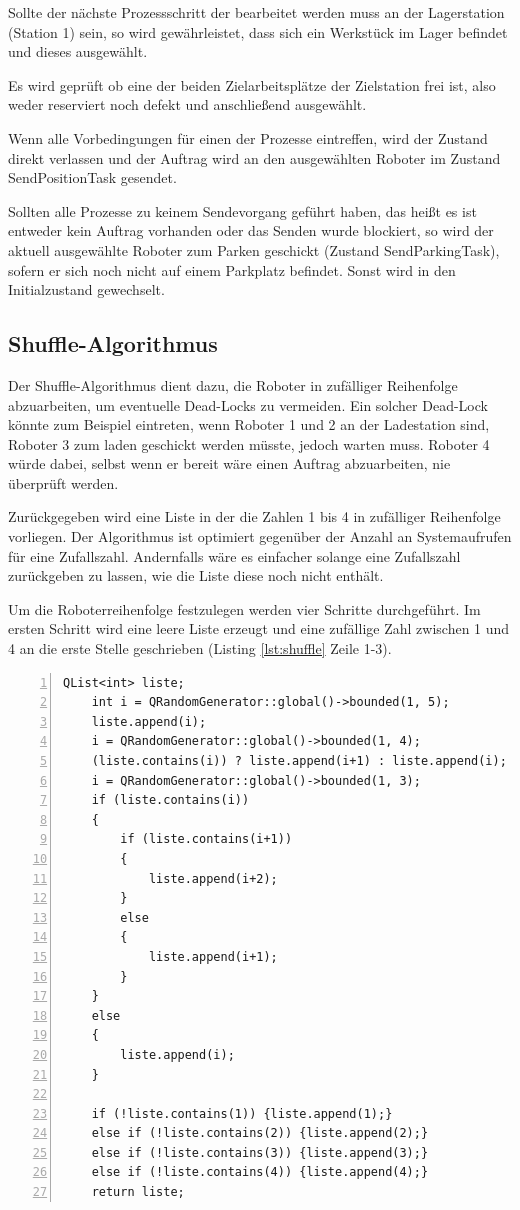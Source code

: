 Sollte der nächste Prozessschritt der bearbeitet werden muss an der Lagerstation (Station 1) sein, so wird gewährleistet, dass sich ein Werkstück im Lager befindet und dieses ausgewählt. 

Es wird geprüft ob eine der beiden Zielarbeitsplätze der Zielstation frei ist, also weder reserviert noch defekt und anschließend ausgewählt. 

Wenn alle Vorbedingungen für einen der Prozesse eintreffen, wird der Zustand direkt verlassen und der Auftrag wird an den ausgewählten Roboter im Zustand SendPositionTask gesendet. 

Sollten alle Prozesse zu keinem Sendevorgang geführt haben, das heißt es ist entweder kein Auftrag vorhanden oder das Senden wurde blockiert, so wird der aktuell ausgewählte Roboter zum Parken geschickt (Zustand SendParkingTask), sofern er sich noch nicht auf einem Parkplatz befindet. Sonst wird in den Initialzustand gewechselt.

\subsection{Shuffle-Algorithmus}
\label{sec:shuffle}

Der Shuffle-Algorithmus dient dazu, die Roboter in zufälliger Reihenfolge abzuarbeiten, um eventuelle Dead-Locks zu vermeiden. Ein solcher Dead-Lock könnte zum Beispiel eintreten, wenn Roboter 1 und 2 an der Ladestation sind, Roboter 3 zum laden geschickt werden müsste, jedoch warten muss. Roboter 4 würde dabei, selbst wenn er bereit wäre einen Auftrag abzuarbeiten, nie überprüft werden.

Zurückgegeben wird eine Liste in der die Zahlen 1 bis 4 in zufälliger Reihenfolge vorliegen. Der Algorithmus ist optimiert gegenüber der Anzahl an Systemaufrufen für eine Zufallszahl. Andernfalls wäre es einfacher solange eine Zufallszahl zurückgeben zu lassen,  wie die Liste diese noch nicht enthält.

Um die Roboterreihenfolge festzulegen werden vier Schritte durchgeführt. Im ersten Schritt wird eine leere Liste erzeugt und eine zufällige Zahl zwischen 1 und 4 an die erste Stelle geschrieben (Listing \ref{lst:shuffle} Zeile 1-3). 

\begin{lstlisting}[frame=single, breaklines=true, numbers=left, stepnumber=2, firstnumber=1, numberstyle = \tiny, caption=Shuffle-Algorithmus,label=lst:shuffle]
    QList<int> liste;
    int i = QRandomGenerator::global()->bounded(1, 5);
    liste.append(i);
    i = QRandomGenerator::global()->bounded(1, 4);
    (liste.contains(i)) ? liste.append(i+1) : liste.append(i);
    i = QRandomGenerator::global()->bounded(1, 3);
    if (liste.contains(i))
    {
        if (liste.contains(i+1))
        {
            liste.append(i+2);
        }
        else
        {
            liste.append(i+1);
        }
    }
    else
    {
        liste.append(i);
    }

    if (!liste.contains(1)) {liste.append(1);}
    else if (!liste.contains(2)) {liste.append(2);}
    else if (!liste.contains(3)) {liste.append(3);}
    else if (!liste.contains(4)) {liste.append(4);}
    return liste;
\end{lstlisting}

